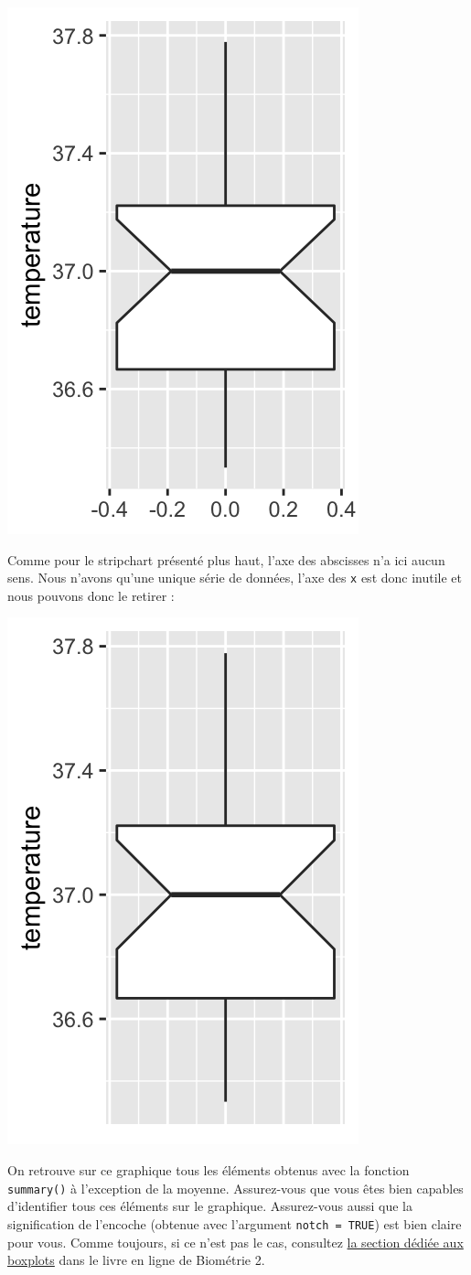 \documentclass[a4paperpaper,]{article}
\newenvironment{Shaded}{\begin{snugshade}}{\end{snugshade}}
\newcommand{\DataTypeTok}[1]{\textcolor[rgb]{0.00,0.34,0.68}{#1}}
\newcommand{\KeywordTok}[1]{\textcolor[rgb]{0.12,0.11,0.11}{\textbf{#1}}}
\newcommand{\NormalTok}[1]{\textcolor[rgb]{0.12,0.11,0.11}{#1}}
\newcommand{\OperatorTok}[1]{\textcolor[rgb]{0.12,0.11,0.11}{#1}}
\newcommand{\OtherTok}[1]{\textcolor[rgb]{0.00,0.43,0.16}{#1}}
\newcommand{\StringTok}[1]{\textcolor[rgb]{0.75,0.01,0.01}{#1}}
\begin{document}
\begin{center}\includegraphics[width=0.25\linewidth]{figure/unnamed-chunk-19-1} \end{center}

Comme pour le stripchart présenté plus haut, l'axe des abscisses n'a ici aucun sens. Nous n'avons qu'une unique série de données, l'axe des \texttt{x} est donc inutile et nous pouvons donc le retirer :

\begin{Shaded}
\end{Shaded}

\begin{center}\includegraphics[width=0.25\linewidth]{figure/unnamed-chunk-20-1} \end{center}

On retrouve sur ce graphique tous les éléments obtenus avec la fonction \texttt{summary()} à l'exception de la moyenne. Assurez-vous que vous êtes bien capables d'identifier tous ces éléments sur le graphique. Assurez-vous aussi que la signification de l'encoche (obtenue avec l'argument \texttt{notch\ =\ TRUE}) est bien claire pour vous. Comme toujours, si ce n'est pas le cas, consultez \href{https://besibo.github.io/DA/viz.html\#les-boites-a-moustaches-ou-boxplots}{la section dédiée aux boxplots} dans le livre en ligne de Biométrie 2.
\end{document}
